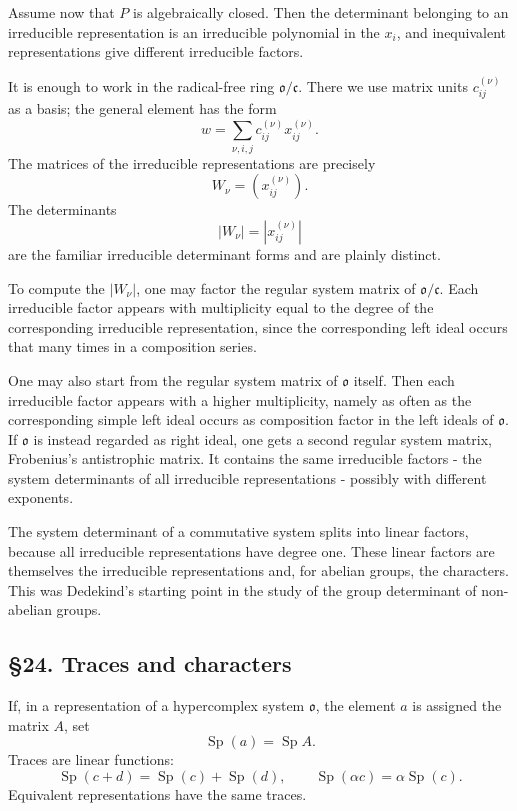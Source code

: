 \documentclass[11pt]{article}
\begin{document}
Assume now that \(P\) is algebraically closed. Then the determinant
belonging to an irreducible representation is an irreducible polynomial
in the \(x_i\), and inequivalent representations give different
irreducible factors.

It is enough to work in the radical-free ring
\(\mathfrak{o}/\mathfrak c\). There we use matrix units
\(c_{ij}^{(\nu)}\) as a basis; the general element has the form \[
  w=\sum_{\nu,i,j} c_{ij}^{(\nu)}x_{ij}^{(\nu)}.
\] The matrices of the irreducible representations are precisely \[
  W_\nu=(x_{ij}^{(\nu)}).
\] The determinants \[
  |W_\nu|=|x_{ij}^{(\nu)}|
\] are the familiar irreducible determinant forms and are plainly
distinct.

To compute the \(|W_\nu|\), one may factor the regular system matrix of
\(\mathfrak{o}/\mathfrak c\). Each irreducible factor appears with
multiplicity equal to the degree of the corresponding irreducible
representation, since the corresponding left ideal occurs that many
times in a composition series.

One may also start from the regular system matrix of \(\mathfrak{o}\)
itself. Then each irreducible factor appears with a higher multiplicity,
namely as often as the corresponding simple left ideal occurs as
composition factor in the left ideals of \(\mathfrak{o}\). If
\(\mathfrak{o}\) is instead regarded as right ideal, one gets a second
regular system matrix, Frobenius's antistrophic matrix. It contains the
same irreducible factors - the system determinants of all irreducible
representations - possibly with different exponents.

The system determinant of a commutative system splits into linear
factors, because all irreducible representations have degree one. These
linear factors are themselves the irreducible representations and, for
abelian groups, the characters. This was Dedekind's starting point in
the study of the group determinant of non-abelian groups.

\subsection{§24. Traces and characters}\label{traces-and-characters}

If, in a representation of a hypercomplex system \(\mathfrak{o}\), the
element \(a\) is assigned the matrix \(A\), set \[
  \operatorname{Sp}(a)=\operatorname{Sp} A.
\] Traces are linear functions: \[
  \operatorname{Sp}(c+d)=\operatorname{Sp}(c)+\operatorname{Sp}(d),
  \qquad
  \operatorname{Sp}(\alpha c)=\alpha\operatorname{Sp}(c).
\] Equivalent representations have the same traces.
\end{document}
